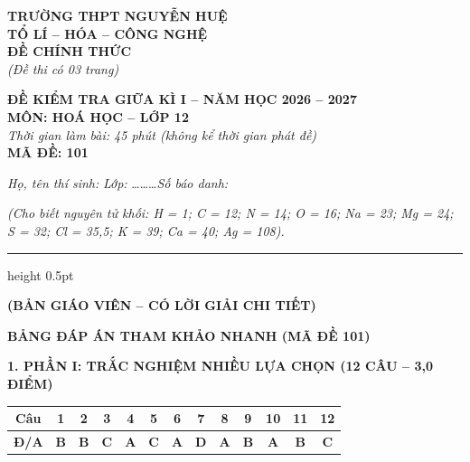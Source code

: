 \documentclass[11pt,a4paper]{article}
\begin{document}
\noindent
\begin{minipage}[t]{0.48\textwidth}
\textbf{TRƯỜNG THPT NGUYỄN HUỆ}\\
\textbf{TỔ LÍ -- HÓA -- CÔNG NGHỆ}\\
\textbf{ĐỀ CHÍNH THỨC}\\
\textit{(Đề thi có 03 trang)}
\end{minipage}
\hfill
\begin{minipage}[t]{0.48\textwidth}
\raggedleft
\textbf{\color{hfRed}ĐỀ KIỂM TRA GIỮA KÌ I -- NĂM HỌC 2026 -- 2027}\\
\textbf{MÔN: HOÁ HỌC -- LỚP 12}\\
\textit{Thời gian làm bài: 45 phút (không kể thời gian phát đề)}\\
\textbf{MÃ ĐỀ: 101}
\end{minipage}

\vspace{4pt}
\noindent
\textit{Họ, tên thí sinh:} \dotfill \textit{Lớp:} \dots\dots\dots \textit{Số báo danh:} \dotfill

\vspace{3pt}
\noindent
\textit{\footnotesize (Cho biết nguyên tử khối: H = 1; C = 12; N = 14; O = 16; Na = 23; Mg = 24; S = 32; Cl = 35,5; K = 39; Ca = 40; Ag = 108).}

\vspace{2pt}
\hrule height 0.5pt

\vspace{4pt}
\begin{center}
\textbf{\color{hfRed}\large (BẢN GIÁO VIÊN -- CÓ LỜI GIẢI CHI TIẾT)}
\end{center}

\vspace{2pt}
\begin{center}
{\color{hfRed}\textbf{\large BẢNG ĐÁP ÁN THAM KHẢO NHANH (MÃ ĐỀ 101)}}
\end{center}

\vspace{2pt}
\noindent
\textbf{\color{mainGreen}1. PHẦN I: TRẮC NGHIỆM NHIỀU LỰA CHỌN (12 CÂU -- 3,0 ĐIỂM)}
\begin{center}
\renewcommand{\arraystretch}{1.2}
\begin{tabular}{|c|c|c|c|c|c|c|c|c|c|c|c|c|}
\hline
\rowcolor{tableGreen}
\textbf{Câu} & \textbf{1} & \textbf{2} & \textbf{3} & \textbf{4} & \textbf{5} & \textbf{6} & \textbf{7} & \textbf{8} & \textbf{9} & \textbf{10} & \textbf{11} & \textbf{12} \\
\hline
\textbf{Đ/A} & \textbf{\color{hfRed}B} & \textbf{\color{hfRed}B} & \textbf{\color{hfRed}C} & \textbf{\color{hfRed}A} & \textbf{\color{hfRed}C} & \textbf{\color{hfRed}A} & \textbf{\color{hfRed}D} & \textbf{\color{hfRed}A} & \textbf{\color{hfRed}B} & \textbf{\color{hfRed}A} & \textbf{\color{hfRed}B} & \textbf{\color{hfRed}C} \\
\hline
\end{tabular}
\end{center}
\end{document}
